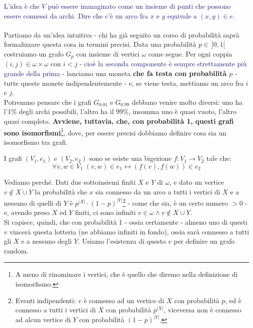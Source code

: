 \textcolor{MidnightBlue}{L'idea è che $V$ può essere immaginato come un insieme di punti che possono essere connessi da archi. Dire che c'è un arco fra $x$ e $y$ equivale a $(x,y) \in e$.\\}
\mbox{}\\
Partiamo da un'idea intuitiva -  chi ha già seguito un corso di probabilità saprà formalizzare questa cosa in termini precisi. Data una probabilità $p \in \, ]0,1[$ costruiamo un grafo
$G_p$ con insieme di vertici $\omega$ come segue. Per ogni coppia $(i,j) \in \omega \times \omega$ con $i < j$ \textcolor{MidnightBlue}{- cioè la seconda componente è sempre strettamente più grande della prima -}
lanciamo una moneta \textbf{che fa testa con probabilità $p$} - tutte queste monete indipendentemente - e, se viene testa, mettiamo un arco fra $i$ e $j$.\\
Potremmo pensare che i grafi $G_{0.01}$ e $G_{0.99}$ debbano venire molto diversi: uno ha l'1\% degli archi possibili, l'altro ha il 99\%, insomma uno è quasi vuoto, l'altro quasi completo. \textbf{Avviene,
tuttavia, che, con probabilità 1, questi grafi sono isomorfismi}\footnote{A meno di rinominare i vertici, che è quello che diremo nella definizione di isomorfismo.}, dove, per essere precisi dobbiamo definire cosa sia un isomorfismo tra grafi.

\begin{definition}
	I grafi $(V_1,e_1)$ e $(V_2,e_2)$ sono  se esiste una bigezione $f : V_1 \rightarrow V_2$ tale che:
	\[ \forall v,w \in V_1 \; (v,w) \in e_1 \leftrightarrow (f(v),f(w)) \in e_2
		\]
\end{definition}

Vediamo perché. Dati due sottoinsiemi finiti $X$ e $Y$ di $\omega$, e dato un vertice $v \not \in X \cup Y$ la probabilità che $x$ sia connesso da un arco a tutti i vertici di $X$ e a nessuno di quelli di $Y$
è $p^{|X|} \cdot (1 - p)^{|Y|}$\footnote{Eventi indipendenti: $v$ è connesso ad un vertice di $X$ con probabilità $p$, ed è connesso a tutti i vertici di $X$ con probabilità $p^{|X|}$, viceversa non è connesso ad alcun vertice di $Y$ con
probabilità $(1-p)^{|Y|}$.} - come che sia, è un certo numero $>0$ - e, avendo preso $X$ ed $Y$ finiti, ci sono infiniti $v \in \omega \land v \not \in X \cup Y$.\\
Si capisce, quindi, che con probabilità 1 - ossia certamente - almeno uno di questi $v$ vincerà questa lotteria (ne abbiamo infiniti in fondo), ossia sarà connesso 
a tutti gli $X$ e a nessuno degli $Y$. Usiamo l'esistenza di questo $v$ per definire un grafo random.

